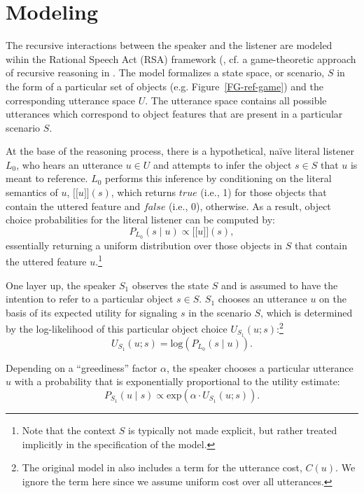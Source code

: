\documentclass[10pt,a4paper]{article}
\newcommand{\sem}[1]{\mbox{$[\![$#1$]\!]$}}
\begin{document}
\section{Modeling}

The recursive interactions between the speaker and the listener are modeled wihin the Rational Speech Act (RSA)  framework (, cf. a game-theoretic approach of recursive reasoning in . The model formalizes a state space, or scenario, $S$ in the form of a particular set of objects (e.g. Figure~\ref{FG-ref-game}) and the corresponding utterance space $U$. The utterance space contains all possible utterances which correspond to object features that are present in a particular scenario $S$.

At the base of the reasoning process, there is a hypothetical, na\"ive literal listener $L_0$, who hears an utterance $u\in U$ and attempts to infer the object $s \in S$ that $u$ is meant to reference. 
$L_0$ performs this inference by conditioning on the literal semantics of $u$, \sem{$u$}$(s)$, which returns $true$ (i.e., 1) for those objects that contain the uttered feature and $false$ (i.e., 0), otherwise.
As a result, object choice probabilities for the literal listener can be computed by: 
\begin{equation}
P_{L_{0}}(s\mid u) \propto \sem{$u$}(s),
\end{equation}
essentially returning a uniform distribution over those objects in $S$ that contain the uttered feature $u$.\footnote{Note that the context $S$ is typically not made explicit, but rather treated implicitly in the specification of the model.}


One layer up, the speaker $S_1$ observes the state $S$ and is assumed to have the intention to refer to a particular object $s \in S$.
$S_1$ chooses an utterance $u$ on the basis of its expected utility for signaling $s$ in the scenario $S$, which is determined by the log-likelihood of this particular object choice $U_{S_1}(u;s)$:\footnote{The original model in  also includes a term for the utterance cost, $C(u)$. We ignore the term here since we assume uniform cost over all utterances.}
\begin{equation}
U_{S_{1}}(u;s) = \textrm{log}(P_{L_{0}}(s \mid u)).
\end{equation}

Depending on a ``greediness'' factor $\alpha$, the speaker chooses a particular utterance $u$ with a probability that is exponentially proportional to the utility estimate: 
\begin{equation}
P_{S_{1}} (u \mid s) \propto   \textrm{exp}(\alpha \cdot U_{S_{1}} (u;s)).
\end{equation}
\end{document}
